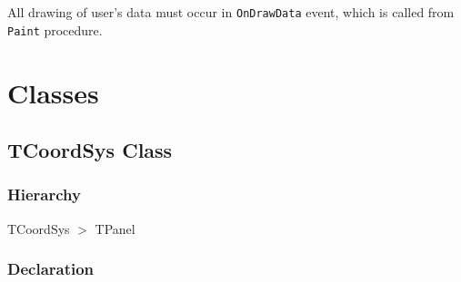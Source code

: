 \documentclass[12pt,a4paper,oneside]{report}
\newcommand{\code}[1]{\texttt{#1}}
\begin{document}
All drawing of user's data must occur in \code{OnDrawData} event, which is called from \code{Paint} procedure.  
\section{Classes}
\subsection{TCoordSys Class}\label{lmcoordsys.TCoordSys}
\subsubsection{Hierarchy}
TCoordSys {$>$} TPanel
\subsubsection{Declaration}
\end{document}

